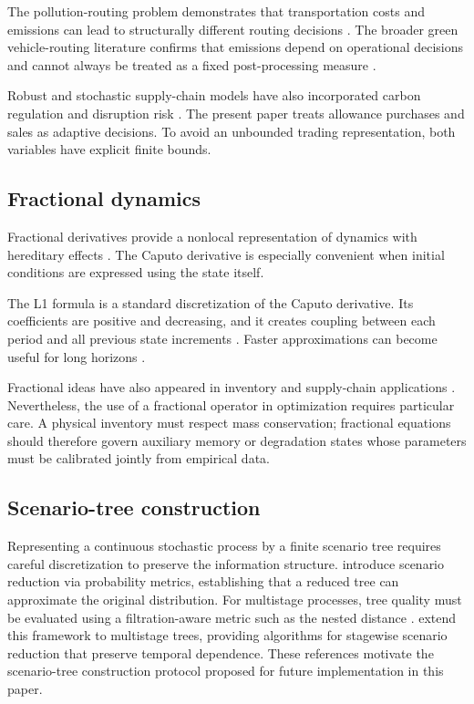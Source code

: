 \documentclass[11pt,a4paper]{article}
\begin{document}
The pollution-routing problem demonstrates that transportation costs
and emissions can lead to structurally different routing decisions
\citep{bektas2011pollution}. The broader green vehicle-routing
literature confirms that emissions depend on operational decisions and
cannot always be treated as a fixed post-processing measure
\citep{asghari2021green}.

Robust and stochastic supply-chain models have also incorporated carbon
regulation and disruption risk
\citep{qu2021carbon,mirzaee2024green}. The present paper treats
allowance purchases and sales as adaptive decisions. To avoid an
unbounded trading representation, both variables have explicit finite
bounds.

\subsection{Fractional dynamics}

Fractional derivatives provide a nonlocal representation of dynamics
with hereditary effects \citep{caputo1967,podlubny1999,diethelm2010}.
The Caputo derivative is especially convenient when initial conditions
are expressed using the state itself.

The L1 formula is a standard discretization of the Caputo derivative.
Its coefficients are positive and decreasing, and it creates coupling
between each period and all previous state increments
\citep{lin2007}. Faster approximations can become useful for long
horizons \citep{zhang2022fast}.

Fractional ideas have also appeared in inventory and supply-chain
applications \citep{cuong2023,haque2026}. Nevertheless, the use of a
fractional operator in optimization requires particular care. A
physical inventory must respect mass conservation; fractional equations
should therefore govern auxiliary memory or degradation states whose
parameters must be calibrated jointly from empirical data.

\subsection{Scenario-tree construction}

Representing a continuous stochastic process by a finite scenario tree
requires careful discretization to preserve the information structure.
\citet{dupacova2003scenarios} introduce scenario reduction via
probability metrics, establishing that a reduced tree can approximate
the original distribution. For multistage processes, tree quality must
be evaluated using a filtration-aware metric such as the nested distance
\citep{pflug2012distance}.
\citet{heitsch2009scenario} extend this framework to multistage trees,
providing algorithms for stagewise scenario reduction that preserve
temporal dependence. These references motivate the scenario-tree
construction protocol proposed for future implementation in this paper.
\end{document}
